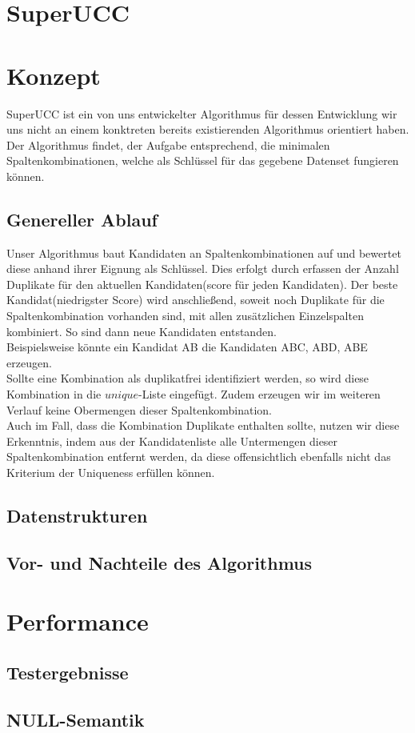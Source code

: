 \documentclass{scrartcl}
\begin{document}
\pagestyle{plain}

\section*{SuperUCC}

\section{Konzept}
SuperUCC ist ein von uns entwickelter Algorithmus für dessen Entwicklung wir uns nicht an einem konktreten bereits existierenden Algorithmus orientiert haben. Der Algorithmus findet, der Aufgabe entsprechend, die minimalen Spaltenkombinationen, welche als Schlüssel für das gegebene Datenset fungieren können.
\subsection{Genereller Ablauf}
Unser Algorithmus baut Kandidaten an Spaltenkombinationen auf und bewertet diese anhand ihrer Eignung als Schlüssel. Dies erfolgt durch erfassen der Anzahl Duplikate für den aktuellen Kandidaten(score für jeden Kandidaten). Der beste Kandidat(niedrigster Score) wird anschließend, soweit noch Duplikate für die Spaltenkombination vorhanden sind, mit allen zusätzlichen Einzelspalten kombiniert. So sind dann neue Kandidaten entstanden. \\
Beispielsweise könnte ein Kandidat AB die Kandidaten ABC, ABD, ABE erzeugen.\\
Sollte eine Kombination als duplikatfrei identifiziert werden, so wird diese Kombination in die $unique$-Liste eingefügt. Zudem erzeugen wir im weiteren Verlauf keine Obermengen dieser Spaltenkombination.\\
Auch im Fall, dass die Kombination Duplikate enthalten sollte, nutzen wir diese Erkenntnis, indem aus der Kandidatenliste alle Untermengen dieser Spaltenkombination entfernt werden, da diese offensichtlich ebenfalls nicht das Kriterium der Uniqueness erfüllen können.
\subsection{Datenstrukturen}

\subsection{Vor- und Nachteile des Algorithmus}

\section{Performance}
\subsection{Testergebnisse}
\subsection{NULL-Semantik}
\end{document}
